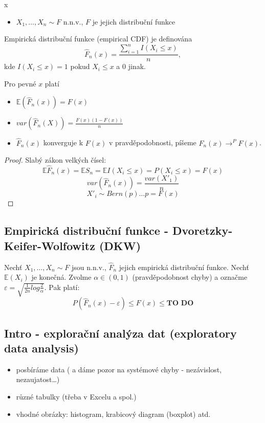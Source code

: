 \documentclass[../main.tex]{subfiles}
\begin{document}
\begin{example}
    {\color{white} x}
    \begin{itemize}
        \item $X_1,\dots,X_n \sim F$ n.n.v., $F$ je jejich distribuční funkce
    \end{itemize}
    \begin{definition}
        Empirická distribuční funkce (empirical CDF) je definována
        \[\hat{F}_n(x) = \frac{\sum^n_{i=1}I(X_i \leq x)}{n},\]
        kde $I(X_i \leq x) = 1$ pokud $X_i \leq x$ a 0 jinak.
    \end{definition}
\end{example}

\begin{theorem}
    Pro pevné $x$ platí
    \begin{itemize}
        \item $\mathbb{E}(\hat{F}_n(x)) = F(x)$
        \item $var(\hat{F}_n(X)) = \frac{F(x)(1-F(x))}{n}$
        \item $\hat{F}_n(x)$ konverguje k $F(x)$ v pravděpodobnosti, píšeme $\hat{F}_n(x)\rightarrow^P F(x)$.
    \end{itemize}
    \begin{proof}
        Slabý zákon velkých čísel:
        \[\mathbb{E}\hat{F}_n(x) = \mathbb{E}S_n = \mathbb{E}I(X_i \leq x) = P(X_i \leq x) = F(x)\]
        \[var(\hat{F}_n(x)) = \frac{var(X'_1)}{n}\]
        \[X'_i \sim Bern(p) \dots p=F(x)\]
    \end{proof}
\end{theorem}

\subsection{Empirická distribuční funkce - Dvoretzky-Keifer-Wolfowitz (DKW)}

\begin{theorem}
    Nechť $X_1,\dots,X_n \sim F$ jsou n.n.v., $\hat{F}_n$ jejich empirická distribuční funkce.
    Nechť $\mathbb{E}(X_i)$ je konečná. Zvolme $\alpha \in (0,1)$ (pravděpodobnost chyby) 
    a označme $\varepsilon = \sqrt{\frac{1}{2n}log \frac{2}{\alpha}}$. Pak platí:
    \[P(\hat{F}_n(x) - \varepsilon) \leq F(x) \leq \textbf{TO DO}\]
\end{theorem}

\subsection{Intro - explorační analýza dat (exploratory data analysis)}
\begin{itemize}
    \item posbíráme data ( a dáme pozor na systémové chyby - nezávislost, nezaujatost\dots)
    \item různé tabulky (třeba v Excelu a spol.)
    \item vhodné obrázky: histogram, krabicový diagram (boxplot) atd.
\end{itemize}
\end{document}
